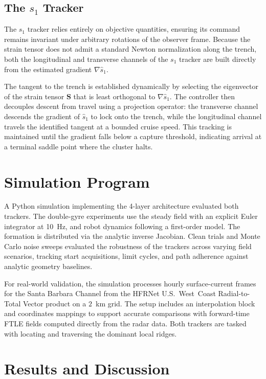 \documentclass[lettersize,journal]{IEEEtran}
\begin{document}
\subsection{The $s_1$ Tracker}
The $s_1$ tracker relies entirely on objective quantities, ensuring its command remains invariant under arbitrary rotations of the observer frame. Because the strain tensor does not admit a standard Newton normalization along the trench, both the longitudinal and transverse channels of the $s_1$ tracker are built directly from the estimated gradient $\nabla\hat{s}_1$.

The tangent to the trench is established dynamically by selecting the eigenvector of the strain tensor $\mathbf{S}$ that is least orthogonal to $\nabla\hat{s}_1$. The controller then decouples descent from travel using a projection operator: the transverse channel descends the gradient of $\hat{s}_1$ to lock onto the trench, while the longitudinal channel travels the identified tangent at a bounded cruise speed. This tracking is maintained until the gradient falls below a capture threshold, indicating arrival at a terminal saddle point where the cluster halts.

\section{Simulation Program}
\label{sec:methods}

A Python simulation implementing the 4-layer architecture evaluated both trackers. The double-gyre experiments use the steady field with an explicit Euler integrator at 10~Hz, and robot dynamics following a first-order model. The formation is distributed via the analytic inverse Jacobian. Clean trials and Monte Carlo noise sweeps evaluated the robustness of the trackers across varying field scenarios, tracking start acquisitions, limit cycles, and path adherence against analytic geometry baselines. 

For real-world validation, the simulation processes hourly surface-current frames for the Santa Barbara Channel from the HFRNet U.S.~West~Coast Radial-to-Total Vector product on a $2$~km grid. The setup includes an interpolation block and coordinates mappings to support accurate comparisons with forward-time FTLE fields computed directly from the radar data. Both trackers are tasked with locating and traversing the dominant local ridges.

\section{Results and Discussion}
\label{sec:results}
\end{document}
